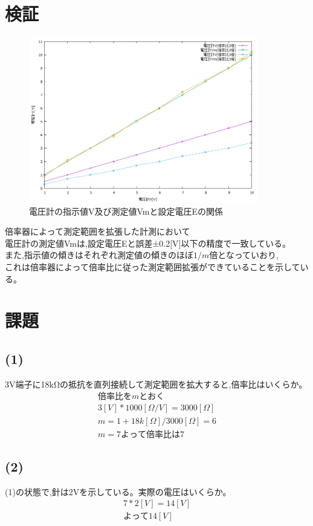 \documentclass[titlepage]{jarticle}
\begin{document}
\section{検証}
\begin{figure}[H]
    \begin{center}
        \includegraphics[width=10cm]{graph/graph01.png}
        \caption{電圧計の指示値V及び測定値Vmと設定電圧Eの関係}
    \end{center}
\end{figure}
倍率器によって測定範囲を拡張した計測において\\
電圧計の測定値Vmは,設定電圧Eと誤差±0.2[V]以下の精度で一致している。\\
また,指示値の傾きはそれぞれ測定値の傾きのほぼ$1/m$倍となっていおり,\\
これは倍率器によって倍率比に従った測定範囲拡張ができていることを示している。

\section{課題}
\subsection{(1)}
3V端子に18kΩの抵抗を直列接続して測定範囲を拡大すると,倍率比はいくらか。
\begin{eqnarray}
    倍率比をmとおく \nonumber\\
    3[V]*1000[Ω/V]=3000[Ω] \nonumber\\
    m=1+18k[Ω]/3000[Ω]=6 \nonumber\\
    m=7 \nonumber
    よって倍率比は7
\end{eqnarray}
\subsection{(2)}
(1)の状態で,針は2Vを示している。実際の電圧はいくらか。
\begin{eqnarray}
    7*2[V]=14[V] \nonumber\\
    よって14[V] \nonumber
\end{eqnarray}
\end{document}
